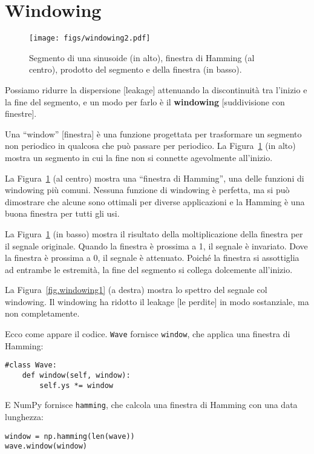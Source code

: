 \documentclass[12pt,a4paper]{book}
\begin{document}
\section{Windowing} 

\begin{figure} 

\centerline{\texttt{[image: figs/windowing2.pdf]}} \caption{Segmento di una sinusoide (in alto), finestra di Hamming (al centro), prodotto del segmento e della finestra (in basso).} \label{fig.windowing2} \end{figure} 

Possiamo ridurre la dispersione [leakage] attenuando la discontinuità tra l'inizio e la fine del segmento, e un modo per farlo è il {\bf windowing} [suddivisione con finestre].

Una ``window'' [finestra] è una funzione progettata per trasformare un segmento non periodico in qualcosa che può passare per periodico. La Figura~\ref{fig.windowing2} (in alto) mostra un segmento in cui la fine non si connette agevolmente all'inizio.

La Figura~\ref{fig.windowing2} (al centro) mostra una ``finestra di Hamming'', una delle funzioni di windowing più comuni. Nessuna funzione di windowing è perfetta, ma si può dimostrare che alcune sono ottimali per diverse applicazioni e la Hamming è una buona finestra per tutti gli usi.

La Figura~\ref{fig.windowing2} (in basso) mostra il risultato della moltiplicazione della finestra per il segnale originale. Quando la finestra è prossima a 1, il segnale è invariato. Dove la finestra è prossima a 0, il segnale è attenuato. Poiché la finestra si assottiglia ad entrambe le estremità, la fine del segmento si collega dolcemente all'inizio.

La Figura~\ref{fig.windowing1} (a destra) mostra lo spettro del segnale col windowing. Il windowing ha ridotto il leakage [le perdite] in modo sostanziale, ma non completamente.

Ecco come appare il codice. {\tt Wave} fornisce {\tt window}, che applica una finestra di Hamming:

\begin{verbatim} 
#class Wave:
    def window(self, window):
        self.ys *= window
 \end{verbatim} 

E NumPy fornisce {\tt hamming}, che calcola una finestra di Hamming con una data lunghezza:

\begin{verbatim} 
window = np.hamming(len(wave))
wave.window(window)
 \end{verbatim} 
\end{document}
